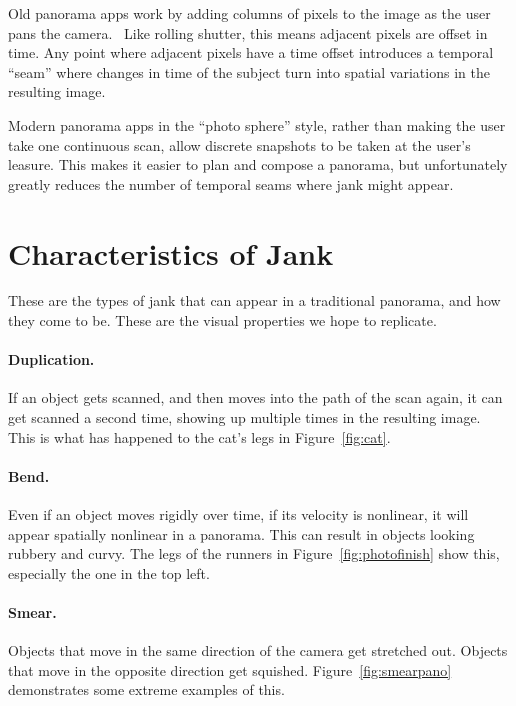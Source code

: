 \documentclass[twocolumn]{article}
\begin{document}
Old panorama apps work by adding columns of pixels to the image as the user pans the camera.~\cite{kuehnel-2012} Like rolling shutter, this means adjacent pixels are offset in time. Any point where adjacent pixels have a time offset introduces a temporal ``seam'' where changes in time of the subject turn into spatial variations in the resulting image.

Modern panorama apps in the ``photo sphere'' style, rather than making the user take one continuous scan, allow discrete snapshots to be taken at the user's leasure. This makes it easier to plan and compose a panorama, but unfortunately greatly reduces the number of temporal seams where jank might appear.

\section{Characteristics of Jank}
\label{sec:characteristics}

These are the types of jank that can appear in a traditional panorama, and how they come to be. These are the visual properties we hope to replicate.

\paragraph{Duplication.} If an object gets scanned, and then moves into the path of the scan again, it can get scanned a second time, showing up multiple times in the resulting image. This is what has happened to the cat's legs in Figure~\ref{fig:cat}.

\paragraph{Bend.} Even if an object moves rigidly over time, if its velocity is nonlinear, it will appear spatially nonlinear in a panorama. This can result in objects looking rubbery and curvy. The legs of the runners in Figure~\ref{fig:photofinish} show this, especially the one in the top left.

\paragraph{Smear.} Objects that move in the same direction of the camera get stretched out. Objects that move in the opposite direction get squished. Figure~\ref{fig:smearpano} demonstrates some extreme examples of this.
\end{document}
